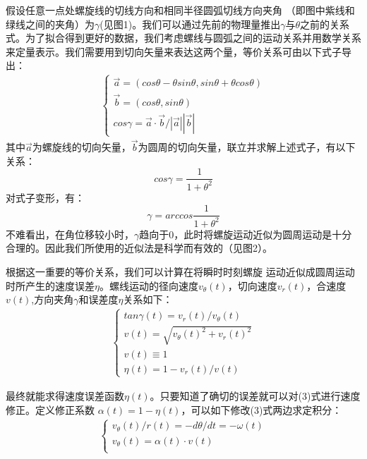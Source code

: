 \documentclass{cumcmthesis1}
\begin{document}
假设任意一点处螺旋线的切线方向和相同半径圆弧切线方向夹角
（即图中紫线和绿线之间的夹角）为$ \gamma $(见图1)。我们可以通过先前的物理量推出$ \gamma $与$ \theta $之前的关系式。为了拟合得到更好的数据，我们考虑螺线与圆弧之间的运动关系并用数学关系来定量表示。我们需要用到切向矢量来表达这两个量，等价关系可由以下式子导出：
\begin{align}
    \begin{cases}
    \vec{a}  = ( cos{\theta}-{\theta}sin{\theta}, sin{\theta}+ {\theta}cos{\theta}  )\\
    \vec{b}  = (cos{\theta},  sin{\theta}   )\\
    cos{\gamma}  =\vec{a}\cdot\vec{b} /|\vec{a}| |\vec{b}| 
    \end{cases}
\end{align}
其中$\vec{a}$为螺旋线的切向矢量，$\vec{b}$为圆周的切向矢量，联立并求解上述式子，有以下关系：
\begin{equation}
    cos{\gamma} = \frac{1}{1+{\theta}^2}
\end{equation}
对式子变形，有：
\begin{equation}
    \gamma = arccos{\frac{1}{1+{\theta}^2}}
\end{equation}
不难看出，在角位移较小时，$\gamma$趋向于0，此时将螺旋运动近似为圆周运动是十分合理的。因此我们所使用的近似法是科学而有效的（见图2）。\par
根据这一重要的等价关系，我们可以计算在将瞬时时刻螺旋
运动近似成圆周运动时所产生的速度误差$ \eta $。螺线运动的径向速度$v_\theta(t)$，切向速度$v_r(t)$，合速度$v(t)$,方向夹角$\gamma$和误差度$\eta$关系如下：
\begin{align}
    \begin{cases}
    tan\gamma(t)=v_r(t)/v_\theta(t)\\
    v(t)=\sqrt{v_\theta(t)^2+v_r(t)^2}\\
    v(t)\equiv 1\\
    \eta(t)=1-v_r(t)/v(t)
    \end{cases}
\end{align}
\par
最终就能求得速度误差函数$ \eta(t)$。只要知道了确切的误差就可以对(3)式进行速度修正。定义修正系数
$\alpha(t)=1-\eta(t)$，可以如下修改(3)式两边求定积分：
\begin{align}
    \begin{cases}
    v_\theta(t)/ r(t)=-d \theta / dt=-\omega (t)\\
    v_\theta(t)=\alpha(t) \cdot v(t)\\
    \end{cases}
\end{align}
\end{document}
